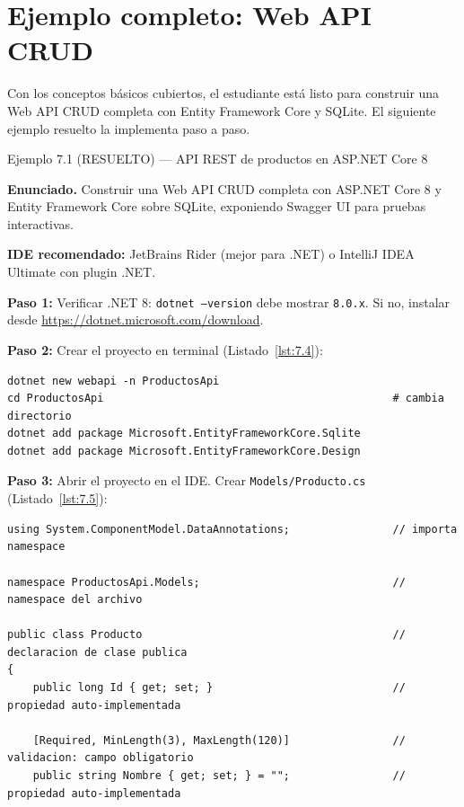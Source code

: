 \documentclass[11pt,a4paper,openany]{book}
\begin{document}
\section{Ejemplo completo: Web API CRUD}

Con los conceptos básicos cubiertos, el estudiante está
listo para construir una Web API CRUD completa con Entity Framework
Core y SQLite. El siguiente ejemplo resuelto la implementa paso a
paso.


\begin{cajaejemplo}{Ejemplo 7.1 (RESUELTO) --- API REST de productos en ASP.NET Core 8}


\textbf{Enunciado.} Construir una Web API CRUD completa con ASP.NET Core 8 y Entity Framework Core sobre SQLite, exponiendo Swagger UI para pruebas interactivas.

\textbf{IDE recomendado:} JetBrains Rider (mejor para .NET) o
IntelliJ IDEA Ultimate con plugin .NET.

\textbf{Paso 1:} Verificar .NET 8: \texttt{dotnet --version} debe
mostrar \texttt{8.0.x}. Si no, instalar desde
\url{https://dotnet.microsoft.com/download}.

\textbf{Paso 2:} Crear el proyecto en terminal (Listado~\ref{lst:7.4}):
\begin{lstlisting}[style=shell,numbers=none,caption={Ejemplo de Shell},label=lst:7.4]
dotnet new webapi -n ProductosApi
cd ProductosApi                                             # cambia directorio
dotnet add package Microsoft.EntityFrameworkCore.Sqlite
dotnet add package Microsoft.EntityFrameworkCore.Design
\end{lstlisting}

\textbf{Paso 3:} Abrir el proyecto en el IDE. Crear \texttt{Models/Producto.cs} (Listado~\ref{lst:7.5}):

\begin{lstlisting}[style=cs,caption={Models/Producto.cs},label=lst:7.5]
using System.ComponentModel.DataAnnotations;                // importa namespace

namespace ProductosApi.Models;                              // namespace del archivo

public class Producto                                       // declaracion de clase publica
{
    public long Id { get; set; }                            // propiedad auto-implementada

    [Required, MinLength(3), MaxLength(120)]                // validacion: campo obligatorio
    public string Nombre { get; set; } = "";                // propiedad auto-implementada


\end{lstlisting}
\end{cajaejemplo}
\end{document}
